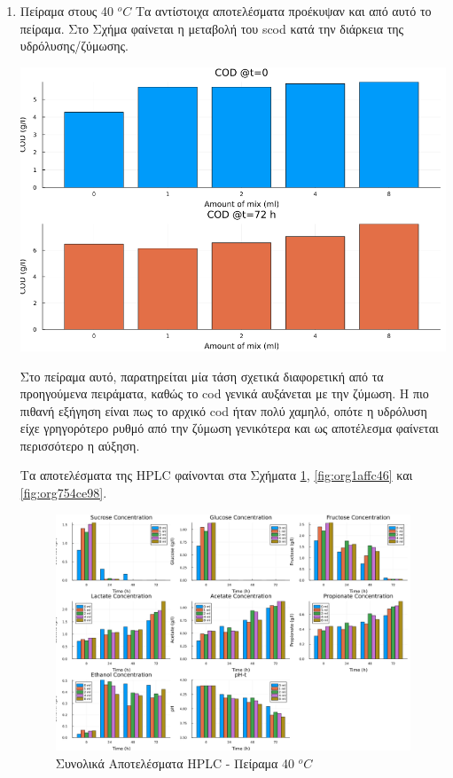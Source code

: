 \documentclass[11pt]{report}
\begin{document}
\begin{enumerate}
\item Πείραμα στους 40 \(^oC\)
\label{sec:org76c5c5c}
Τα αντίστοιχα αποτελέσματα προέκυψαν και από αυτό το πείραμα. Στο Σχήμα φαίνεται η μεταβολή του \acrshort{scod} κατά την διάρκεια της υδρόλυσης/ζύμωσης.

\begin{center}
\includegraphics[width=.9\linewidth]{../plots/28_11/cod_bar_28_11.png}
\end{center}

Στο πείραμα αυτό, παρατηρείται μία τάση σχετικά διαφορετική από τα προηγούμενα πειράματα, καθώς το \acrshort{cod} γενικά αυξάνεται με την ζύμωση. Η πιο πιθανή εξήγηση είναι πως το αρχικό \acrshort{cod} ήταν πολύ χαμηλό, οπότε η υδρόλυση είχε γρηγορότερο ρυθμό από την ζύμωση γενικότερα και ως αποτέλεσμα φαίνεται περισσότερο η αύξηση.

Τα αποτελέσματα της HPLC φαίνονται στα Σχήματα \ref{fig:org977d4ed}, \ref{fig:org1affc46} και \ref{fig:org754ce98}.

\begin{figure}[htbp]
\centering
\includegraphics[width=.9\linewidth]{../plots/28_11/final_bar_28_11.png}
\caption{\label{fig:org977d4ed}Συνολικά Αποτελέσματα HPLC - Πείραμα 40 \(^oC\)}
\end{figure}


\end{enumerate}
\end{document}
